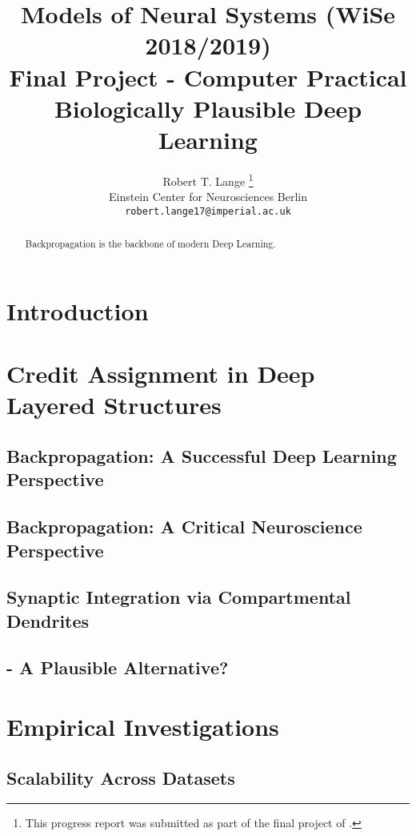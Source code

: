 \documentclass{article}
\title{Models of Neural Systems (WiSe 2018/2019)\\
	   Final Project - Computer Practical \\
	   Biologically Plausible Deep Learning}
\author{
  Robert T. Lange \thanks{This progress report was submitted as part of the final project of .} \\
  Einstein Center for Neurosciences Berlin\\
  \texttt{robert.lange17@imperial.ac.uk} \\
}
\theoremstyle{definition}
\begin{document}
\maketitle


\begin{abstract}
Backpropagation is the backbone of modern Deep Learning.
\end{abstract}

\section{Introduction}


\section{Credit Assignment in Deep Layered Structures}

\subsection*{Backpropagation: A Successful Deep Learning Perspective}

\subsection*{Backpropagation: A Critical Neuroscience Perspective}

\subsection*{Synaptic Integration via Compartmental Dendrites}

\subsection*{\citet{guerguiev2017} - A Plausible Alternative?}

\section{Empirical Investigations}

\subsection*{Scalability Across Datasets}
\end{document}
